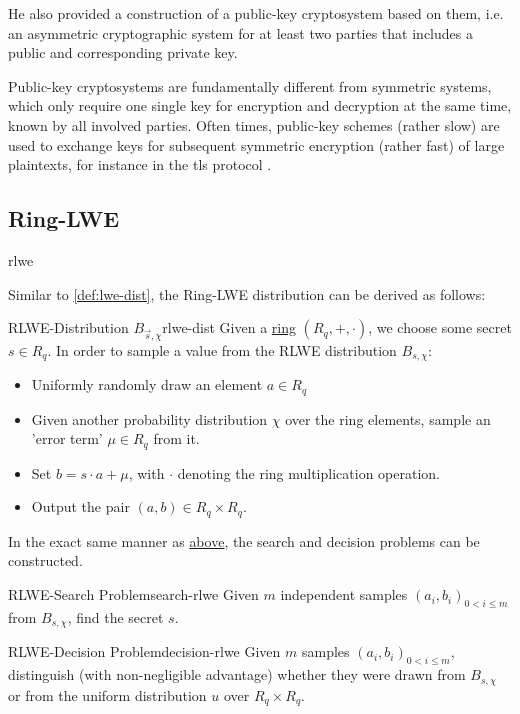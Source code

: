 He also provided a construction of a public-key cryptosystem based on them, i.e. an asymmetric cryptographic
system for at least two parties that includes a public and corresponding private key.

Public-key cryptosystems are fundamentally different from symmetric systems, which only
require one single key for encryption and decryption at the same time, known by all involved parties.
Often times, public-key schemes (rather slow) are used to exchange keys for subsequent symmetric encryption
(rather fast) of large plaintexts, for instance in the \gls{tls} protocol \parencite{rfc8446}.

\subsection{Ring-LWE}
\Gls{rlwe}
\cite{2010-rlwe-original}

Similar to \autoref{def:lwe-dist}, the Ring-LWE distribution can be derived as follows:

\begin{corollary}{RLWE-Distribution $B_{\vec{s}, \chi}$}{rlwe-dist}
  Given a \hyperref[def:ring]{ring} $(R_q, +, \cdot)$, we choose some secret $s \in R_q$.
  In order to sample a value from the RLWE distribution $B_{s, \chi}$:
  \begin{itemize}
    \item Uniformly randomly draw an element $a \in R_q$
    \item Given another probability distribution $\chi$ over the ring elements,
          sample an 'error term' $\mu \in R_q$ from it.
    \item Set $b = s \cdot a + \mu$, with $\cdot$ denoting the ring multiplication operation.
    \item Output the pair $(a, b) \in R_q \times R_q$.
  \end{itemize}
\end{corollary}

In the exact same manner as \hyperref[subsec:lwe]{above}, the search and decision problems
can be constructed.

\begin{corollary}{RLWE-Search Problem}{search-rlwe}
  Given $m$ independent samples $(a_i, b_i)_{0 < i \leq m}$ from $B_{s, \chi}$, find the secret $s$.
\end{corollary}
\begin{corollary}{RLWE-Decision Problem}{decision-rlwe}
  Given $m$ samples $(a_i, b_i)_{0 < i \leq m}$, distinguish (with non-negligible advantage)
  whether they were drawn from $B_{s, \chi}$ or from the uniform distribution
  $u$ over $R_q \times R_q$.
\end{corollary}


